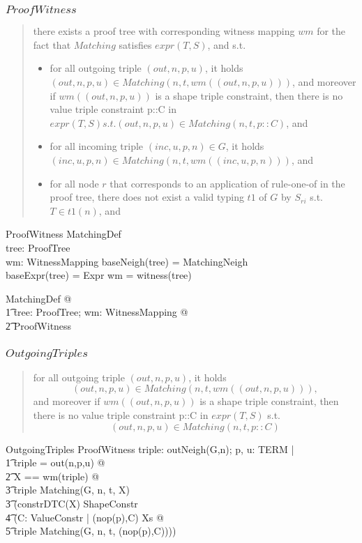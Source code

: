 \documentclass{article}
\begin{document}
\subsubsection{$ProofWitness$}
\begin{quote}
there exists a proof tree with corresponding witness mapping $wm$ for the fact that $Matching$ satisfies $expr(T, S)$, and s.t.
\begin{itemize}
\item for all outgoing triple $(out, n, p, u)$, it holds $(out, n, p, u) \in Matching(n, t, wm((out, n, p, u)))$, and moreover if $wm((out, n, p, u))$ is a shape triple constraint, then there is no value triple constraint p::C in $expr(T, S) s.t. (out, n, p, u) \in Matching(n, t, p::C)$, and
\item for all incoming triple $(inc, u, p, n) \in G$, it holds $(inc, u, p, n) \in Matching(n, t, wm((inc, u, p, n)))$, and
\item for all node $r$ that corresponds to an application of rule-one-of in the proof tree, there does not exist a valid typing $t1$ of $G$ by $S_{ri}$ s.t. $T \in t1(n)$, and
\end{itemize}
\end{quote}
\begin{schema}{ProofWitness}
	MatchingDef \\
	tree: ProofTree \\
	wm: WitnessMapping
\where
	baseNeigh(tree) = MatchingNeigh \\
	baseExpr(tree) = Expr
\also
	wm = witness(tree)
\end{schema}

\begin{zed}
	\forall MatchingDef @ \\
\t1		\exists tree: ProofTree; wm: WitnessMapping @ \\
\t2			ProofWitness
\end{zed}

\subsubsection{$OutgoingTriples$}
\begin{quote}
for all outgoing triple $(out, n, p, u)$, it holds 
\[
(out, n, p, u) \in Matching(n, t, wm((out, n, p, u))), 
\]
and moreover if $wm((out, n, p, u))$ is a shape triple constraint, then there is no value triple constraint p::C in $expr(T, S)$ s.t. 
\[
(out, n, p, u) \in Matching(n, t, p::C)
\]
\end{quote}
\begin{schema}{OutgoingTriples}
	ProofWitness
\where
	\forall triple: outNeigh(G,n); p, u: TERM | \\
\t1		triple = out(n,p,u) @ \\
\t2			\LET X == wm(triple) @ \\
\t3				triple \in Matching(G, n, t, X) \land \\
\t3				(constrDTC(X) \in ShapeConstr \implies \\
\t4					\lnot (\exists C: ValueConstr | (nop(p),C) \in Xs @ \\
\t5						triple \in Matching(G, n, t, (nop(p),C))))
\end{schema}
\end{document}
